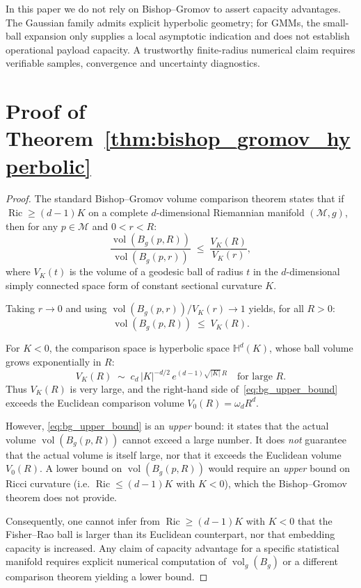 \documentclass[a4paper,fleqn]{cas-dc}
\begin{document}
In this paper we do not rely on Bishop--Gromov to assert capacity
advantages. The Gaussian family admits explicit hyperbolic geometry;
for GMMs, the small-ball expansion only supplies a local asymptotic
indication and does not establish operational payload capacity.
A trustworthy finite-radius numerical claim requires verifiable
samples, convergence and uncertainty diagnostics.

\section{Proof of Theorem~\ref{thm:bishop_gromov_hyperbolic}}
\label{app:proof_bishop_gromov}

\begin{proof}
The standard Bishop--Gromov volume comparison theorem 
\cite[Thm.~III.4.2]{chavel2006riemannian} states that if 
$\operatorname{Ric} \geq (d-1)K$ on a complete $d$-dimensional Riemannian 
manifold $(\mathcal{M},g)$, then for any $p\in\mathcal{M}$ and 
$0 < r < R$:
\[
\frac{\operatorname{vol}(B_{g}(p,R))}{\operatorname{vol}(B_{g}(p,r))}
\;\leq\;
\frac{V_{K}(R)}{V_{K}(r)},
\]
where $V_{K}(t)$ is the volume of a geodesic ball of radius $t$ in the 
$d$-dimensional simply connected space form of constant sectional 
curvature $K$.

Taking $r\to 0$ and using 
$\operatorname{vol}(B_{g}(p,r))/V_{K}(r) \to 1$ yields, for all $R>0$:
\begin{equation}
\operatorname{vol}(B_{g}(p,R)) \;\leq\; V_{K}(R).
\label{eq:bg_upper_bound}
\end{equation}

For $K<0$, the comparison space is hyperbolic space 
$\mathbb{H}^{d}(K)$, whose ball volume grows exponentially in $R$:
\[
V_{K}(R) \;\sim\; c_{d}\,|K|^{-d/2}\,e^{(d-1)\sqrt{|K|}\,R}
\quad\text{for large }R.
\]
Thus $V_{K}(R)$ is very large, and the right-hand side 
of~\eqref{eq:bg_upper_bound} exceeds the Euclidean comparison volume 
$V_{0}(R)=\omega_{d}R^{d}$.

However, \eqref{eq:bg_upper_bound} is an \emph{upper} bound: it states 
that the actual volume $\operatorname{vol}(B_{g}(p,R))$ cannot exceed a 
large number.  It does \emph{not} guarantee that the actual volume is 
itself large, nor that it exceeds the Euclidean volume $V_{0}(R)$.  
A lower bound on $\operatorname{vol}(B_{g}(p,R))$ would require an 
\emph{upper} bound on Ricci curvature (i.e. 
$\operatorname{Ric} \leq (d-1)K$ with $K<0$), which the 
Bishop--Gromov theorem does not provide.

Consequently, one cannot infer from $\operatorname{Ric} \geq (d-1)K$ 
with $K<0$ that the Fisher--Rao ball is larger than its Euclidean 
counterpart, nor that embedding capacity is increased.  Any claim of 
capacity advantage for a specific statistical manifold requires explicit 
numerical computation of $\operatorname{vol}_{g}(B_{g})$ or a different 
comparison theorem yielding a lower bound.
\end{proof}
\end{document}

